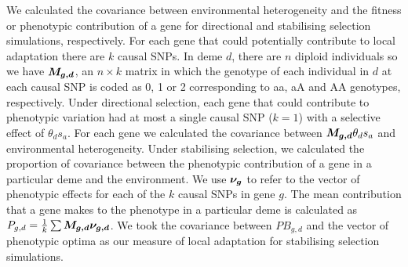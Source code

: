 \documentclass[10pt,twoside,lineno, twocolumn]{GSA_format}
\newcommand{\bm}[1]{\mbox{\boldmath{$#1$}}}
\begin{document}
We calculated the covariance between environmental heterogeneity and the fitness or phenotypic contribution of a gene for directional and stabilising selection simulations, respectively. For each gene that could potentially contribute to local adaptation there are $k$ causal SNPs. In deme $d$, there are $n$ diploid individuals so we have $\bm{M_{g,d}}$, an $n \times k$ matrix in which the genotype of each individual in $d$ at each causal SNP is coded as 0, 1 or 2 corresponding to aa, aA and AA genotypes, respectively. Under directional selection, each gene that could contribute to phenotypic variation had at most a single causal SNP ($k = 1$) with a selective effect of $\theta_ds_a$. For each gene we calculated the covariance between $\bm{M_{g,d}}\theta_ds_a$ and environmental heterogeneity. Under stabilising selection, we calculated the proportion of covariance between the phenotypic contribution of a gene in a particular deme and the environment. We use $\bm{\nu_g}$ to refer to the vector of phenotypic effects for each of the $k$ causal SNPs in gene $g$. The mean contribution that a gene makes to the phenotype in a particular deme is calculated as $P_{g,d} = \frac{1}{k}\sum \bm{M_{g,d} \nu_{g,d}}$. We took the covariance between $PB_{g,d}$ and the vector of phenotypic optima as our measure of local adaptation for stabilising selection simulations. 




\end{document}
